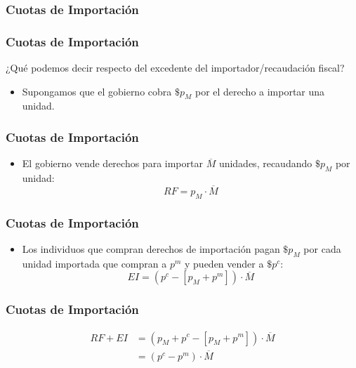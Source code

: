 \documentclass[dvipsnames,table,leqno]{beamer}
\newcommand{\peq}[1]{{\scriptscriptstyle{#1}}}
\newcommand{\rp}[1]{\left(#1\right)}
\newcommand{\sqp}[1]{\left[#1\right]}
\begin{document}
		\begin{frame}
			\frametitle{Cuotas de Importación}
			\begin{table}[htbp!]
				\centering
			\end{table}
		\end{frame}

		\begin{frame}
			\frametitle{Cuotas de Importación}
			¿Qué podemos decir respecto del excedente del importador/recaudación fiscal?
			\begin{itemize}
				\item Supongamos que el gobierno cobra $\$p_\peq{M}$ por el derecho a importar una unidad.
			\end{itemize}
		\end{frame}

		\begin{frame}
			\frametitle{Cuotas de Importación}
			\begin{itemize}
				\item El gobierno vende derechos para importar $\overline{M}$ unidades, recaudando $\$p_\peq{M}$ por unidad: $$RF=p_\peq{M}\cdot\overline{M}$$
			\end{itemize}
		\end{frame}
		
		\begin{frame}
			\frametitle{Cuotas de Importación}
			\begin{itemize}
				\item Los individuos que compran derechos de importación pagan $\$p_\peq{M}$ por cada unidad importada que compran a $p^\peq{m}$ y pueden vender a $\$p^\peq{c}$: $$EI=\rp{p^\peq{c}-\sqp{p_\peq{M}+p^\peq{m}}}\cdot\overline{M}$$
			\end{itemize}
		\end{frame}

		\begin{frame}
			\frametitle{Cuotas de Importación}
			\begin{align*}
				RF+EI&=\rp{p_\peq{M}+p^\peq{c}-\sqp{p_\peq{M}+p^\peq{m}}}\cdot\overline{M}\\
						 &=\rp{p^\peq{c}-p^\peq{m}}\cdot\overline{M}
			\end{align*}
		\end{frame}
\end{document}
